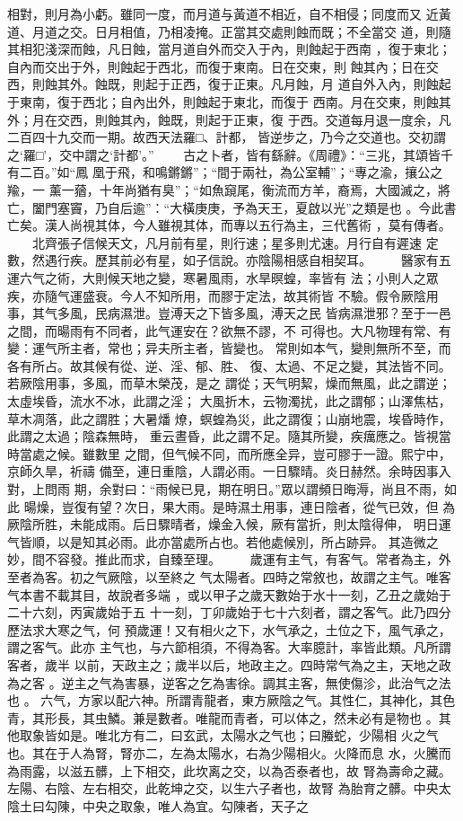 \documentclass{ctexart}
\begin{document}
相對，則月為小虧。雖同一度，而月道与黃道不相近，自不相侵；同度而又 近黃道、月道之交。日月相值，乃相凌掩。正當其交處則蝕而既；不全當交 道，則隨其相犯淺深而蝕，凡日蝕，當月道自外而交入于內，則蝕起于西南 ，復于東北；自內而交出于外，則蝕起于西北，而復于東南。日在交東，則 蝕其內；日在交西，則蝕其外。蝕既，則起于正西，復于正東。凡月蝕，月 道自外入內，則蝕起于東南，復于西北；自內出外，則蝕起于東北，而復于 西南。月在交東，則蝕其外；月在交西，則蝕其內，蝕既，則起于正東，復 于西。交道每月退一度余，凡二百四十九交而一期。故西天法羅□、計都， 皆逆步之，乃今之交道也。交初謂之`羅□'，交中謂之`計都'。'' 　　古之卜者，皆有繇辭。《周禮》：``三兆，其頌皆千有二百。''如``鳳 凰于飛，和鳴鏘鏘''；``間于兩社，為公室輔''；``專之渝，攘公之羭，一 薰一蕕，十年尚猶有臭''；``如魚竀尾，衡流而方羊，裔焉，大國滅之，將 亡，闔門塞竇，乃自后逾''：``大橫庚庚，予為天王，夏啟以光''之類是也 。今此書亡矣。漢人尚視其体，今人雖視其体，而專以五行為主，三代舊術 ，莫有傳者。 　　北齊張子信候天文，凡月前有星，則行速；星多則尤速。月行自有遲速 定數，然遇行疾。歷其前必有星，如子信說。亦陰陽相感自相契耳。 　　醫家有五運六气之術，大則候天地之變，寒暑風雨，水旱暝蝗，率皆有 法；小則人之眾疾，亦隨气運盛衰。今人不知所用，而膠于定法，故其術皆 不驗。假令厥陰用事，其气多風，民病濕泄。豈溥天之下皆多風，溥天之民 皆病濕泄邪？至于一邑之間，而暘雨有不同者，此气運安在？欲無不謬，不 可得也。大凡物理有常、有變：運气所主者，常也；异夫所主者，皆變也。 常則如本气，變則無所不至，而各有所占。故其候有從、逆、淫、郁、胜、 復、太過、不足之變，其法皆不同。若厥陰用事，多風，而草木榮茂，是之 謂從；天气明絜，燥而無風，此之謂逆；太虛埃昏，流水不冰，此謂之淫； 大風折木，云物濁扰，此之謂郁；山澤焦枯，草木凋落，此之謂胜；大暑燔 燎，螟蝗為災，此之謂復；山崩地震，埃昏時作，此謂之太過；陰森無時， 重云晝昏，此之謂不足。隨其所變，疾癘應之。皆視當時當處之候。雖數里 之間，但气候不同，而所應全异，豈可膠于一證。熙宁中，京師久旱，祈禱 備至，連日重陰，人謂必雨。一日驟晴。炎日赫然。余時因事入對，上問雨 期，余對曰：``雨候已見，期在明日。''眾以謂頻日晦溽，尚且不雨，如此 暘燥，豈復有望？次日，果大雨。是時濕土用事，連日陰者，從气已效，但 為厥陰所胜，未能成雨。后日驟晴者，燥金入候，厥有當折，則太陰得伸， 明日運气皆順，以是知其必雨。此亦當處所占也。若他處候別，所占跡异。 其造微之妙，間不容發。推此而求，自臻至理。 　　歲運有主气，有客气。常者為主，外至者為客。初之气厥陰，以至終之 气太陽者。四時之常敘也，故謂之主气。唯客气本書不載其目，故說者多端 ，或以甲子之歲天數始于水十一刻，乙丑之歲始于二十六刻，丙寅歲始于五 十一刻，丁卯歲始于七十六刻者，謂之客气。此乃四分歷法求大寒之气，何 預歲運！又有相火之下，水气承之，土位之下，風气承之，謂之客气。此亦 主气也，与六節相須，不得為客。大率臆計，率皆此類。凡所謂客者，歲半 以前，天政主之；歲半以后，地政主之。四時常气為之主，天地之政為之客 。逆主之气為害暴，逆客之乞為害徐。調其主客，無使傷沴，此治气之法也 。 六气，方家以配六神。所謂青龍者，東方厥陰之气。其性仁，其神化，其色 青，其形長，其虫鱗。兼是數者。唯龍而青者，可以体之，然未必有是物也 。其他取象皆如是。唯北方有二，曰玄武，太陽水之气也；曰螣蛇，少陽相 火之气也。其在于人為腎，腎亦二，左為太陽水，右為少陽相火。火降而息 水，火騰而為雨露，以滋五髒，上下相交，此坎离之交，以為否泰者也，故 腎為壽命之藏。左陽、右陰、左右相交，此乾坤之交，以生六子者也，故腎 為胎育之髒。中央太陰土曰勾陳，中央之取象，唯人為宜。勾陳者，天子之 
\end{document}
